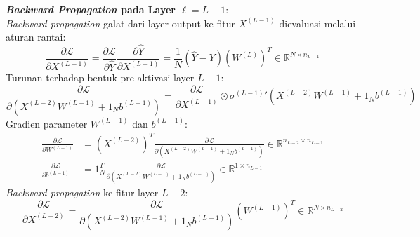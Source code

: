 \documentclass[11pt,a4paper]{article}
\def\mathbf#1{#1}%
\theoremstyle{plain}
\theoremstyle{definition}
\theoremstyle{remark}
\begin{document}
\noindent \textbf{\textit{Backward Propagation} pada Layer $\ell = L-1$}: \\
\textit{Backward propagation} galat dari layer output ke fitur $X^{(L-1)}$ dievaluasi melalui aturan rantai:
\begin{equation}
    \frac{\partial \mathcal{L}}{\partial X^{(L-1)}} = \frac{\partial \mathcal{L}}{\partial \hat{Y}} \frac{\partial \hat{Y}}{\partial X^{(L-1)}} = \frac{1}{N} \left( \hat{Y} - Y \right) \left( W^{(L)} \right)^T \in \mathbb{R}^{N \times n_{L-1}} \label{eq:dL_dXLprev}
\end{equation}
Turunan terhadap bentuk pre-aktivasi layer $L-1$:
\begin{equation}
    \frac{\partial \mathcal{L}}{\partial \left( X^{(L-2)} W^{(L-1)} + \mathbf{1}_N \mathbf{b}^{(L-1)} \right)} = \frac{\partial \mathcal{L}}{\partial X^{(L-1)}} \odot {\sigma^{(L-1)}}'\left( X^{(L-2)} W^{(L-1)} + \mathbf{1}_N \mathbf{b}^{(L-1)} \right)
\end{equation}
Gradien parameter $W^{(L-1)}$ dan $\mathbf{b}^{(L-1)}$:
\begin{align}
    \frac{\partial \mathcal{L}}{\partial W^{(L-1)}} &= \left( X^{(L-2)} \right)^T \frac{\partial \mathcal{L}}{\partial \left( X^{(L-2)} W^{(L-1)} + \mathbf{1}_N \mathbf{b}^{(L-1)} \right)} \in \mathbb{R}^{n_{L-2} \times n_{L-1}} \\[0.3em]
    \frac{\partial \mathcal{L}}{\partial \mathbf{b}^{(L-1)}} &= \mathbf{1}_N^T \frac{\partial \mathcal{L}}{\partial \left( X^{(L-2)} W^{(L-1)} + \mathbf{1}_N \mathbf{b}^{(L-1)} \right)} \in \mathbb{R}^{1 \times n_{L-1}}
\end{align}
\textit{Backward propagation} ke fitur layer $L-2$:
\begin{equation}
    \frac{\partial \mathcal{L}}{\partial X^{(L-2)}} = \frac{\partial \mathcal{L}}{\partial \left( X^{(L-2)} W^{(L-1)} + \mathbf{1}_N \mathbf{b}^{(L-1)} \right)} \left( W^{(L-1)} \right)^T \in \mathbb{R}^{N \times n_{L-2}}
\end{equation}
\end{document}
